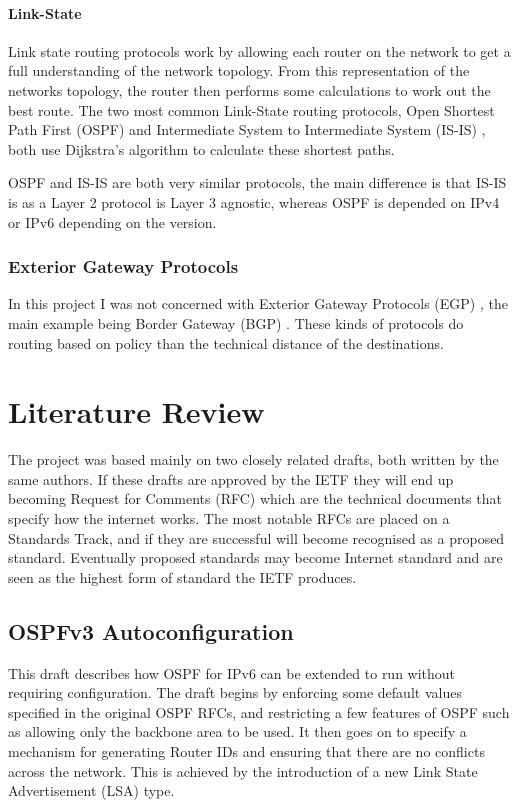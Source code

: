 \documentclass[12pt]{report}
\begin{document}
\subsubsection{Link-State}
Link state routing protocols work by allowing each router on the network to get
a full understanding of the network topology. From this representation of the
networks topology, the router then performs some calculations to work out the
best route. The two most common Link-State routing protocols, Open Shortest
Path First (OSPF)  and
Intermediate System to Intermediate System (IS-IS)
, both use
Dijkstra's algorithm to calculate these shortest paths. 

OSPF and IS-IS are both very similar protocols, the main difference is that
IS-IS is as a Layer 2 protocol is Layer 3 agnostic, whereas OSPF is depended on
IPv4 or IPv6 depending on the version.

\subsection{Exterior Gateway Protocols}
In this project I was not concerned with Exterior Gateway Protocols (EGP)
, the main example being Border
Gateway (BGP) . These kinds of
protocols do routing based on policy than the technical distance of the
destinations.

\chapter{Literature Review} 

The project was based mainly on two closely related drafts, both written by the
same authors. If these drafts are approved by the IETF they will end up
becoming Request for Comments (RFC) 
which are the technical documents that specify how the internet works. The most
notable RFCs are placed on a Standards Track, and if they are successful will
become recognised as a proposed standard. Eventually proposed standards may
become Internet standard and are seen as the highest form of standard the
IETF produces. 

\section{OSPFv3 Autoconfiguration}
This draft describes how OSPF for IPv6 can be extended to run without requiring
configuration. The draft begins by enforcing some default values specified in
the original OSPF RFCs, and restricting a few features of OSPF such as
allowing only the backbone area to be used. It then goes on to specify a
mechanism for generating Router IDs and ensuring that there are no conflicts
across the network. This is achieved by the introduction of a new Link State
Advertisement (LSA)  type.
\end{document}

